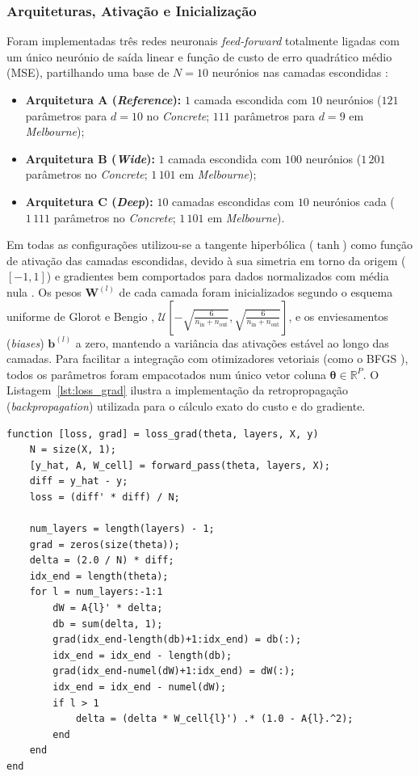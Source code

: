 \documentclass[conference]{IEEEtran}
\begin{document}
\subsubsection{Arquiteturas, Ativação e Inicialização}
Foram implementadas três redes neuronais \textit{feed-forward} totalmente ligadas com um único neurónio de saída linear e função de custo de erro quadrático médio (MSE), partilhando uma base de $N = 10$ neurónios nas camadas escondidas \cite{b1, b6}:
\begin{itemize}
    \item \textbf{Arquitetura A (\textit{Reference}):} $1$ camada escondida com $10$ neurónios ($121$ parâmetros para $d=10$ no \textit{Concrete}; $111$ parâmetros para $d=9$ em \textit{Melbourne});
    \item \textbf{Arquitetura B (\textit{Wide}):} $1$ camada escondida com $100$ neurónios ($1\,201$ parâmetros no \textit{Concrete}; $1\,101$ em \textit{Melbourne});
    \item \textbf{Arquitetura C (\textit{Deep}):} $10$ camadas escondidas com $10$ neurónios cada ($1\,111$ parâmetros no \textit{Concrete}; $1\,101$ em \textit{Melbourne}).
\end{itemize}

Em todas as configurações utilizou-se a tangente hiperbólica ($\tanh$) como função de ativação das camadas escondidas, devido à sua simetria em torno da origem ($[-1, 1]$) e gradientes bem comportados para dados normalizados com média nula \cite{b8}. Os pesos $\mathbf{W}^{(l)}$ de cada camada foram inicializados segundo o esquema uniforme de Glorot e Bengio \cite{b8}, $\mathcal{U}\!\left[-\sqrt{\frac{6}{n_{\text{in}} + n_{\text{out}}}}, \sqrt{\frac{6}{n_{\text{in}} + n_{\text{out}}}}\right]$, e os enviesamentos (\textit{biases}) $\mathbf{b}^{(l)}$ a zero, mantendo a variância das ativações estável ao longo das camadas. Para facilitar a integração com otimizadores vetoriais (como o BFGS \cite{b9}), todos os parâmetros foram empacotados num único vetor coluna $\boldsymbol{\theta} \in \mathbb{R}^P$. O Listagem~\ref{lst:loss_grad} ilustra a implementação da retropropagação (\textit{backpropagation}) \cite{b7} utilizada para o cálculo exato do custo e do gradiente.

\begin{lstlisting}[caption={Excerto de \texttt{ann\_lib.m}: cálculo do MSE e retropropagação do gradiente.},label={lst:loss_grad}]
function [loss, grad] = loss_grad(theta, layers, X, y)
    N = size(X, 1);
    [y_hat, A, W_cell] = forward_pass(theta, layers, X);
    diff = y_hat - y;
    loss = (diff' * diff) / N;

    num_layers = length(layers) - 1;
    grad = zeros(size(theta));
    delta = (2.0 / N) * diff;
    idx_end = length(theta);
    for l = num_layers:-1:1
        dW = A{l}' * delta;
        db = sum(delta, 1);
        grad(idx_end-length(db)+1:idx_end) = db(:);
        idx_end = idx_end - length(db);
        grad(idx_end-numel(dW)+1:idx_end) = dW(:);
        idx_end = idx_end - numel(dW);
        if l > 1
            delta = (delta * W_cell{l}') .* (1.0 - A{l}.^2);
        end
    end
end
\end{lstlisting}
\end{document}
